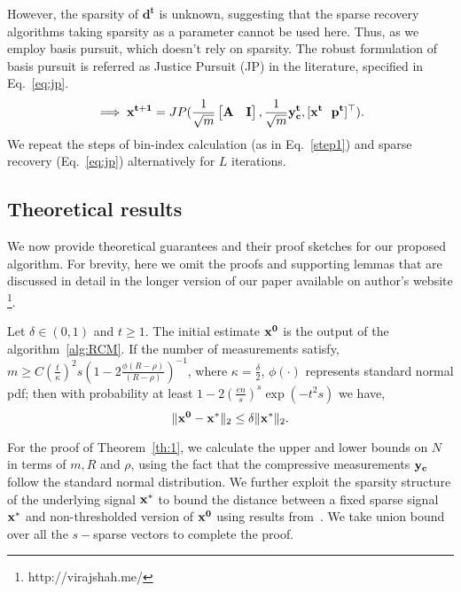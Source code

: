 However, the sparsity of $\mathbf{d^t}$ is unknown, suggesting that the sparse recovery algorithms taking sparsity as a parameter cannot be used here. Thus, as we employ basis pursuit, which doesn't rely on sparsity. The robust formulation of basis pursuit is referred as Justice Pursuit (JP) \cite{Laska2009} in the literature, specified in Eq.~\ref{eq:jp}.
\begin{equation}
\implies \mathbf{{x^{t+1}}} = JP(\frac{1}{\sqrt{m}}\begin{bmatrix} \mathbf{A} & \mathbf{I} \end{bmatrix},\frac{1}{\sqrt{m}}\mathbf{y^t_c},[\mathbf{x^t~~p^t}]^\top).
\label{eq:jp}
\end{equation}
We repeat the steps of bin-index calculation (as in Eq.~\ref{step1}) and sparse recovery (Eq.~\ref{eq:jp}) alternatively for $L$ iterations.%

\subsection{Theoretical results}
We now provide theoretical guarantees and their proof sketches for our proposed algorithm. For brevity, here we omit the proofs and supporting lemmas that are discussed in detail in the longer version of our paper available on author's website \footnote{http://virajshah.me/}.
\begin{theorem}
	Let $\delta \in (0,1)$ and $t \geq 1$. The initial estimate $\mathbf{x^0}$ is the output of the algorithm~\ref{alg:RCM}. If the number of measurements satisfy, $m \geq C(\frac{t}{\kappa})^2s\left(1-2\frac{\phi(R-\rho)}{(R-\rho)} \right)^{-1}$, where $\kappa = \frac{\delta}{2}$, $\phi(\cdot)$ represents standard normal pdf; then  with probability at least $1 - 2\left(\frac{en}{s}\right)^s\exp\left(-t^2s\right)$ we have,
	$$
	\|\mathbf{x^0} - \mathbf{x^*}\|_2 \leq \delta \|\mathbf{x^*}\|_2.
	$$
	\label{th:1}
\end{theorem}
For the proof of Theorem~\ref{th:1}, we calculate the upper and lower bounds on $N$ in terms of $m,R$ and $\rho$, using the fact that the compressive measurements $\mathbf{y_c}$ follow the standard normal distribution. We further exploit the sparsity structure of the underlying signal $\mathbf{x^*}$ to bound the distance between a fixed sparse signal $\mathbf{x^*}$ and non-thresholded version of $\mathbf{x^0}$ using results from~\cite{vershynin2010introduction}. We take union bound over all the $s-$sparse vectors to complete the proof.

